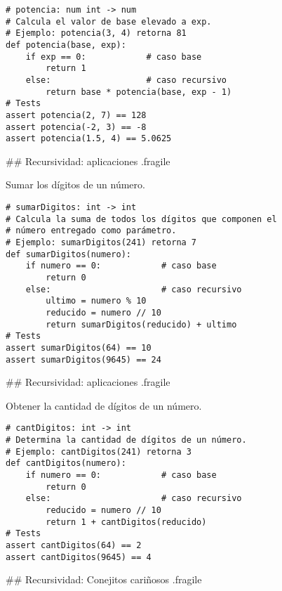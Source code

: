 \vspace{3ex}

\begin{lstlisting}[style=frame02]
# potencia: num int -> num
# Calcula el valor de base elevado a exp.
# Ejemplo: potencia(3, 4) retorna 81
def potencia(base, exp):
    if exp == 0:            # caso base
        return 1
    else:                   # caso recursivo
        return base * potencia(base, exp - 1)
# Tests
assert potencia(2, 7) == 128
assert potencia(-2, 3) == -8
assert potencia(1.5, 4) == 5.0625
\end{lstlisting}

## Recursividad: aplicaciones {.fragile}

\bgnblockgood
{} Sumar los dígitos de un número.
\trmblockgood

\pause

\begin{lstlisting}[style=frame02]
# sumarDigitos: int -> int
# Calcula la suma de todos los dígitos que componen el
# número entregado como parámetro.
# Ejemplo: sumarDigitos(241) retorna 7
def sumarDigitos(numero):
    if numero == 0:            # caso base
        return 0
    else:                      # caso recursivo
        ultimo = numero % 10
        reducido = numero // 10
        return sumarDigitos(reducido) + ultimo
# Tests
assert sumarDigitos(64) == 10
assert sumarDigitos(9645) == 24
\end{lstlisting}


## Recursividad: aplicaciones {.fragile}

\bgnblockgood
{} Obtener la cantidad de dígitos de un número.
\trmblockgood

\pause


\begin{lstlisting}[style=frame02]
# cantDigitos: int -> int
# Determina la cantidad de dígitos de un número.
# Ejemplo: cantDigitos(241) retorna 3
def cantDigitos(numero):
    if numero == 0:            # caso base
        return 0
    else:                      # caso recursivo
        reducido = numero // 10
        return 1 + cantDigitos(reducido)
# Tests
assert cantDigitos(64) == 2
assert cantDigitos(9645) == 4
\end{lstlisting}


## Recursividad: Conejitos cariñosos {.fragile}


